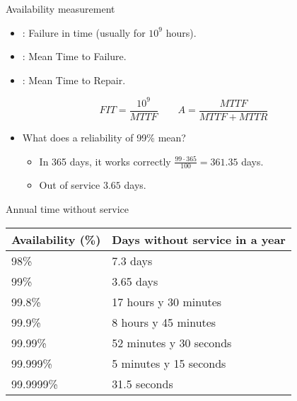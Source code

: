 \begin{frame}[t]{Availability measurement}
\begin{itemize}
  \item {}: Failure in time (usually for $10^9$ hours).
  \item {}: Mean Time to Failure.
  \item {}: Mean Time to Repair.
\end{itemize}

\begin{equation*}
FIT = \frac{10^9}{MTTF}
\quad\quad
A = \frac{MTTF}{MTTF + MTTR}
\end{equation*}

\begin{itemize}
  \item What does a reliability of 99\% mean?	
    \begin{itemize}
      \item In 365 days, it works correctly $\frac{99 \cdot 365}{100} = 361.35$ days.
      \item Out of service $3.65$ days.
    \end{itemize}
\end{itemize}
\end{frame}

\begin{frame}{Annual time without service}
\begin{center}
{\small
\begin{tabular}{|l|l|}
\hline
Availability (\%) & Days without service in a year\\
\hline
\hline
98\% & 7.3 days\\
\hline
99\% & 3.65 days\\
\hline
99.8\% & 17 hours y 30 minutes\\
\hline
99.9\% & 8 hours y 45 minutes\\
\hline
99.99\% & 52 minutes y 30 seconds\\
\hline
99.999\% & 5 minutes y 15 seconds\\
\hline
99.9999\% & 31.5 seconds\\
\hline
\end{tabular}
}
\end{center}
\end{frame}


